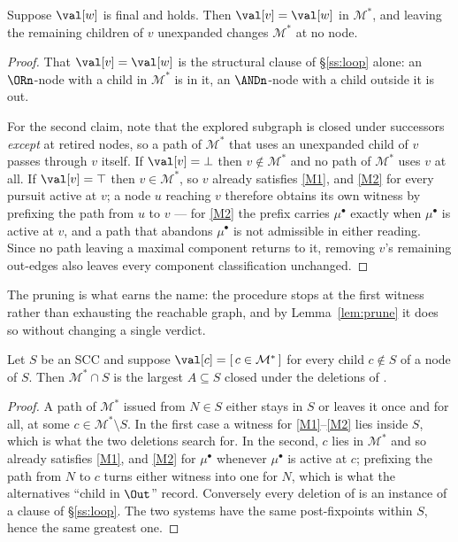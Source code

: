 \begin{lemma}[Pruning]\label{lem:prune}
Suppose $\val[w]$ is final and  holds. Then $\val[v]=\val[w]$ in $\mathcal M^{*}$, and
leaving the remaining children of $v$ unexpanded changes $\mathcal M^{*}$ at no node.
\end{lemma}
\begin{proof}
That $\val[v]=\val[w]$ is the structural clause of \S\ref{ss:loop} alone: an $\ORn$-node with a child
in $\mathcal M^{*}$ is in it, an $\ANDn$-node with a child outside it is out.

For the second claim, note that the explored subgraph is closed under successors \emph{except} at
retired nodes, so a path of $\mathcal M^{*}$ that uses an unexpanded child of $v$ passes through $v$
itself. If $\val[v]=\bot$ then $v\notin\mathcal M^{*}$ and no path of $\mathcal M^{*}$ uses $v$ at
all. If $\val[v]=\top$ then $v\in\mathcal M^{*}$, so $v$ already satisfies \ref{M1}, and \ref{M2} for
every pursuit active at $v$; a node $u$ reaching $v$ therefore obtains its own witness by prefixing
the path from $u$ to $v$ --- for \ref{M2} the prefix carries $\mu^\bullet$ exactly when $\mu^\bullet$
is active at $v$, and a path that abandons $\mu^\bullet$ is not admissible in either reading. Since
no path leaving a maximal component returns to it, removing $v$'s remaining out-edges also leaves
every component classification unchanged.
\end{proof}

\noindent
The pruning is what earns the name: the procedure stops at the first witness rather than exhausting
the reachable graph, and by Lemma~\ref{lem:prune} it does so without changing a single verdict.

\begin{lemma}[Locality]\label{lem:locality}
Let $S$ be an SCC and suppose $\val[c]=[\,c\in\mathcal M^{*}\,]$ for every child $c\notin S$ of a
node of $S$. Then $\mathcal M^{*}\cap S$ is the largest $A\subseteq S$ closed under the deletions of
.
\end{lemma}
\begin{proof}
A path of $\mathcal M^{*}$ issued from $N\in S$ either stays in $S$ or leaves it once and for all, at
some $c\in\mathcal M^{*}\setminus S$. In the first case a witness for \ref{M1}--\ref{M2} lies inside
$S$, which is what the two deletions search for. In the second, $c$ lies in $\mathcal M^{*}$ and so
already satisfies \ref{M1}, and \ref{M2} for $\mu^\bullet$ whenever $\mu^\bullet$ is active at $c$;
prefixing the path from $N$ to $c$ turns either witness into one for $N$, which is what the
alternatives ``child in $\Out$'' record. Conversely every deletion of \Eliminate{} is an instance of
a clause of \S\ref{ss:loop}. The two systems have the same post-fixpoints within $S$,
hence the same greatest one.
\end{proof}

